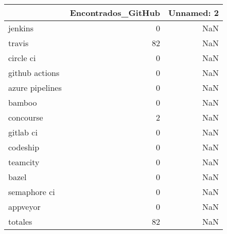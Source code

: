 \begin{tabular}{lrr}
\toprule
{} &  Encontrados\_GitHub &  Unnamed: 2 \\
\midrule
jenkins         &                   0 &         NaN \\
travis          &                  82 &         NaN \\
circle ci       &                   0 &         NaN \\
github actions  &                   0 &         NaN \\
azure pipelines &                   0 &         NaN \\
bamboo          &                   0 &         NaN \\
concourse       &                   2 &         NaN \\
gitlab ci       &                   0 &         NaN \\
codeship        &                   0 &         NaN \\
teamcity        &                   0 &         NaN \\
bazel           &                   0 &         NaN \\
semaphore ci    &                   0 &         NaN \\
appveyor        &                   0 &         NaN \\
totales         &                  82 &         NaN \\
\bottomrule
\end{tabular}

